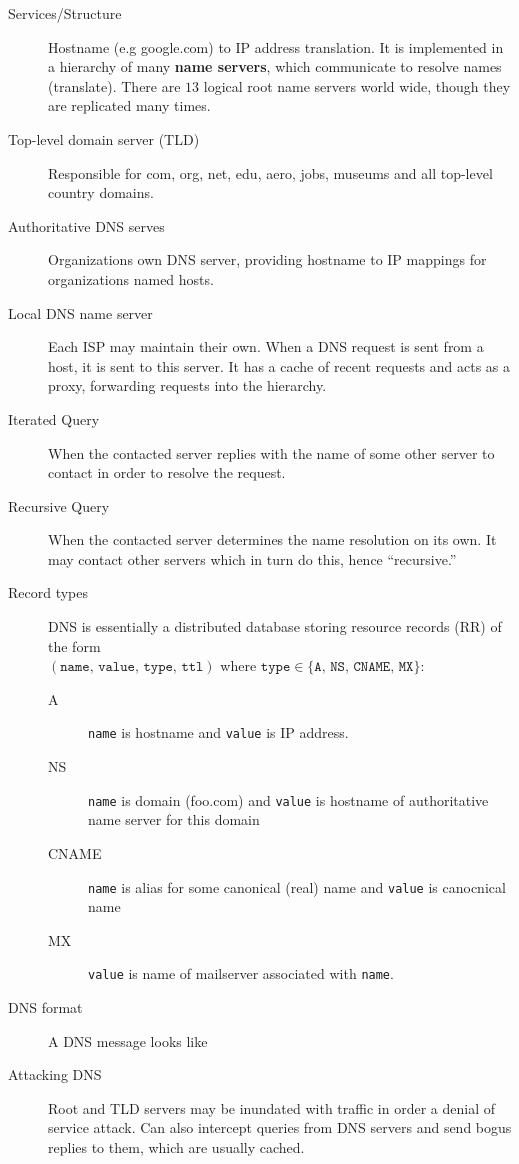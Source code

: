 \documentclass{article}
\begin{document}
\begin{description}
    \item[Services/Structure] Hostname (e.g google.com) to IP address translation. It is implemented
    in a hierarchy of many \textbf{name servers}, which communicate to resolve names (translate).
    There are $13$ logical root name servers world wide, though they are replicated many times.
    
    \item[Top-level domain server (TLD)] Responsible for com, org, net, edu, aero, jobs, museums and 
    all top-level country domains.
    
    \item[Authoritative DNS serves] Organizations own DNS server, providing hostname to IP mappings
    for organizations named hosts.
    
    \item[Local DNS name server] Each ISP may maintain their own. When a DNS request is sent from a 
    host, it is sent to this server. It has a cache of recent requests and acts as a proxy, forwarding
    requests into the hierarchy.
    
    \item[Iterated Query] When the contacted server replies with the name of some other server to 
    contact in order to resolve the request.
    
    \item[Recursive Query] When the contacted server determines the name resolution on its own. It 
    may contact other servers which in turn do this, hence ``recursive.''
    
    \item[Record types] DNS is essentially a distributed database storing resource records (RR) of 
    the form \\
    $(\texttt{name, value, type, ttl})$ where $\texttt{type}\in\{\texttt{A, NS, CNAME, 
    MX}\}$:
    \begin{description}
        \item[A] \texttt{name} is hostname and \texttt{value} is IP address.
        \item[NS] \texttt{name} is domain (foo.com) and \texttt{value} is hostname of authoritative
        name server for this domain
        \item[CNAME] \texttt{name} is alias for some canonical (real) name and \texttt{value} is 
        canocnical name
        \item[MX] \texttt{value} is name of mailserver associated with \texttt{name}.
    \end{description}
    
    \item[DNS format] A DNS message looks like
    
    \item[Attacking DNS] Root and TLD servers may be inundated with traffic in order a denial of 
    service attack. Can also intercept queries from DNS servers and send bogus replies to them, which
    are usually cached.
\end{description}
\end{document}
